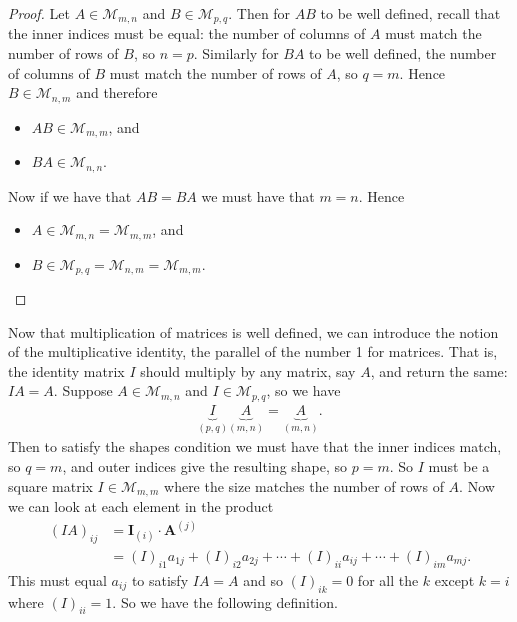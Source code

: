 \begin{proof}
Let $A\in\mathcal{M}_{m,n}$ and $B\in\mathcal{M}_{p,q}$. Then for $AB$ to be well defined, recall that the inner indices must be equal: the number of columns of $A$ must match the number of rows of $B$, so $n=p$. Similarly for $BA$ to be well defined, the number of columns of $B$ must match the number of rows of $A$, so $q=m$. Hence $B\in\mathcal{M}_{n,m}$ and therefore
\begin{itemize}
\item $AB \in\mathcal{M}_{m,m}$, and
\item $BA \in\mathcal{M}_{n,n}$.
\end{itemize}
Now if we have that $AB=BA$ we must have that $m=n$. Hence
\begin{itemize}
\item $A \in\mathcal{M}_{m,n}=\mathcal{M}_{m,m}$, and
\item $B \in\mathcal{M}_{p,q}=\mathcal{M}_{n,m}=\mathcal{M}_{m,m}$.
\end{itemize}

\end{proof}

\noindent Now that multiplication of matrices is well defined, we can introduce the notion of the multiplicative identity, the parallel of the number 1 for matrices. That is, the identity matrix $I$ should multiply by any matrix, say $A$, and return the same: $IA=A$. Suppose $A\in\mathcal{M}_{m,n}$ and $I\in\mathcal{M}_{p,q}$, so we have
\begin{align*}
\underbrace{I}_{(p,q)} \underbrace{A}_{(m,n)} = \underbrace{A}_{(m,n)}.
\end{align*}
Then to satisfy the shapes condition we must have that the inner indices match, so $q=m$, and outer indices give the resulting shape, so $p=m$. So $I$ must be a square matrix $I\in\mathcal{M}_{m,m}$ where the size matches the number of rows of $A$. Now we can look at each element in the product
\begin{align*}
(IA)_{ij} &= \mathbf{I}_{(i)}\cdot\mathbf{A}^{(j)} \\
&= (I)_{i1}a_{1j} + (I)_{i2}a_{2j} + \cdots + (I)_{ii}a_{ij} + \cdots + (I)_{im}a_{mj}.
\end{align*}
This must equal $a_{ij}$ to satisfy $IA=A$ and so $(I)_{ik}=0$ for all the $k$ except $k=i$ where $(I)_{ii}=1$. So we have the following definition.


